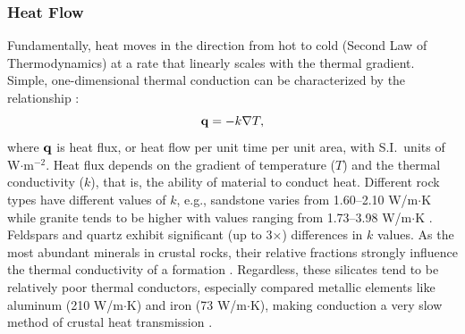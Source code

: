 \subsubsection{Heat Flow}\label{ch2:heatflow}
Fundamentally, heat moves in the direction from hot to cold (Second Law of Thermodynamics) at a rate that linearly scales with the thermal gradient. Simple, one-dimensional thermal conduction can be characterized by the relationship \citep[Fourier's Law,][p.\ 270]{fowler_solid_2005}:
\begin{equation}\label{eq:conduction}
{\bf q} = -k %
\nabla T%
,
\end{equation}
where ${\bf q}$ is heat flux, or heat flow per unit time per unit area, with S.I.\ units of W$\cdot$m$^{-2}$. Heat flux depends on the gradient of temperature ($T$) and the thermal conductivity ($k$), that is, the ability of material to conduct heat. Different rock types have different values of $k$, e.g., sandstone varies from 1.60--2.10 W/m$\cdot$K while granite tends to be higher with values ranging from 1.73--3.98 W/m$\cdot$K \citep[p.\ 30]{dipippo_geothermal_2012}. Feldspars and quartz exhibit significant (up to 3$\times$) differences in $k$ values. As the most abundant minerals in crustal rocks, their relative fractions strongly influence the thermal conductivity of a formation \citep[p.\ 22]{glassley_geothermal_2015}. Regardless, these silicates tend to be relatively poor thermal conductors, especially compared metallic elements like aluminum (210 W/m$\cdot$K) and iron (73 W/m$\cdot$K), making conduction a very slow method of crustal heat transmission \citep[p.\ 23]{dipippo_geothermal_2012}.

